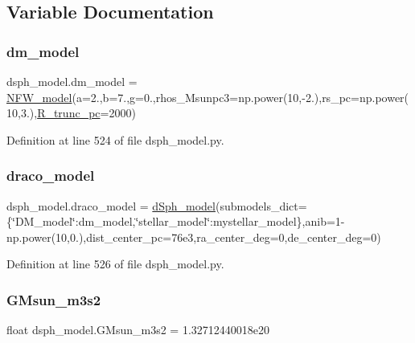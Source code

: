 \subsection{Variable Documentation}
\mbox{\label{namespacedsph__model_a83bb8253e5a6c16c6d8f2b3ae8643576}} 
\subsubsection{\texorpdfstring{dm\+\_\+model}{dm\_model}}
{\footnotesize\ttfamily dsph\+\_\+model.\+dm\+\_\+model = \hyperlink{classdsph__model_1_1NFW__model}{N\+F\+W\+\_\+model}(a=2.,b=7.,g=0.,rhos\+\_\+\+Msunpc3=np.\+power(10,-\/2.),rs\+\_\+pc=np.\+power(10,3.),\hyperlink{namespacedsph__model_a03ec56ecf56f64e59a6be020a76a36f1}{R\+\_\+trunc\+\_\+pc}=2000)}



Definition at line 524 of file dsph\+\_\+model.\+py.

\mbox{\label{namespacedsph__model_ab28142aa13968c1b7647e1fccabec0c6}} 
\subsubsection{\texorpdfstring{draco\+\_\+model}{draco\_model}}
{\footnotesize\ttfamily dsph\+\_\+model.\+draco\+\_\+model = \hyperlink{classdsph__model_1_1dSph__model}{d\+Sph\+\_\+model}(submodels\+\_\+dict=\{\char`\"{}D\+M\+\_\+model\char`\"{}\+:dm\+\_\+model,\char`\"{}stellar\+\_\+model\char`\"{}\+:mystellar\+\_\+model\},anib=1-\/np.\+power(10,0.),dist\+\_\+center\+\_\+pc=76e3,ra\+\_\+center\+\_\+deg=0,de\+\_\+center\+\_\+deg=0)}



Definition at line 526 of file dsph\+\_\+model.\+py.

\mbox{\label{namespacedsph__model_a783ea3c074de2e7c951b342b5749a522}} 
\subsubsection{\texorpdfstring{G\+Msun\+\_\+m3s2}{GMsun\_m3s2}}
{\footnotesize\ttfamily float dsph\+\_\+model.\+G\+Msun\+\_\+m3s2 = 1.\+32712440018e20}



